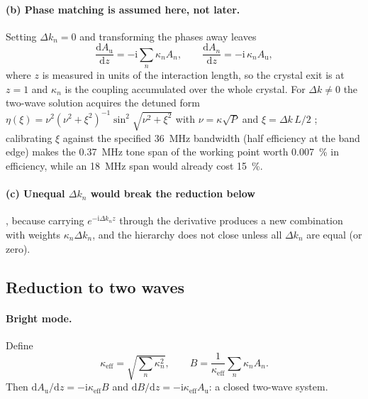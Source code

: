 \documentclass[11pt,a4paper]{article}
\newcommand{\Au}{\ensuremath{A_\mathrm{u}}}
\begin{document}
\paragraph{(b) Phase matching is assumed here, not later.} Setting
$\Delta k_n = 0$ and transforming the phases away leaves
\begin{equation}
  \frac{\mathrm{d}\Au}{\mathrm{d}z} = -\mathrm{i}\sum_n \kappa_n A_n ,
  \qquad
  \frac{\mathrm{d}A_n}{\mathrm{d}z} = -\mathrm{i}\,\kappa_n \Au ,
  \label{eq:coupled}
\end{equation}
where $z$ is measured in units of the interaction length, so the crystal exit
is at $z=1$ and $\kappa_n$ is the coupling accumulated over the whole
crystal. For $\Delta k\neq0$ the two-wave solution acquires the detuned form
$\eta(\xi) = \nu^2(\nu^2+\xi^2)^{-1}\sin^2\sqrt{\nu^2+\xi^2}$ with
$\nu = \kappa\sqrt{P}$ and $\xi = \Delta k\,L/2$ \cite{kogelnik1969};
calibrating $\xi$ against the specified \SI{36}{\mega\hertz} bandwidth
\cite{aaaod} (half efficiency at the band edge) makes the \SI{0.37}{\mega\hertz}
tone span of the working point worth \SI{0.007}{\percent} in efficiency,
while an \SI{18}{\mega\hertz} span would already cost \SI{15}{\percent}.

\paragraph{(c) Unequal $\Delta k_n$ would break the reduction below}, because
carrying $e^{-\mathrm{i}\Delta k_n z}$ through the derivative produces a new
combination with weights $\kappa_n\Delta k_n$, and the hierarchy does not
close unless all $\Delta k_n$ are equal (or zero).

\subsection{Reduction to two waves}

\paragraph{Bright mode.} Define
\begin{equation}
  \kappa_\mathrm{eff} = \sqrt{\textstyle\sum_n \kappa_n^2} ,
  \qquad
  B = \frac{1}{\kappa_\mathrm{eff}}\sum_n \kappa_n A_n .
  \label{eq:brightmode}
\end{equation}
Then $\mathrm{d}\Au/\mathrm{d}z = -\mathrm{i}\kappa_\mathrm{eff}B$ and
$\mathrm{d}B/\mathrm{d}z = -\mathrm{i}\kappa_\mathrm{eff}\Au$: a closed
two-wave system.
\end{document}
